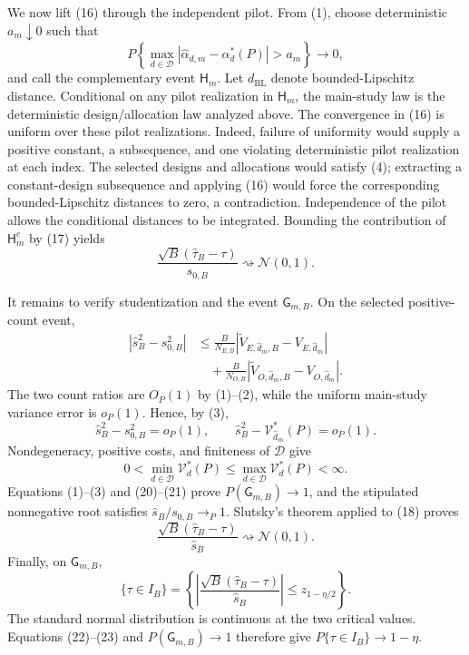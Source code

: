 We now lift (16) through the independent pilot.  From (1), choose deterministic \(a_m\downarrow0\) such that
\[
 P\left\{\max_{d\in\mathcal D}
 |\widehat\alpha_{d,m}-\alpha_d^*(P)|>a_m\right\}
 \longrightarrow0,                                         \tag{17}
\]
and call the complementary event \(\mathsf H_m\).  Let \(d_{\mathrm{BL}}\) denote bounded-Lipschitz distance.  Conditional on any pilot realization in \(\mathsf H_m\), the main-study law is the deterministic design/allocation law analyzed above.  The convergence in (16) is uniform over these pilot realizations.  Indeed, failure of uniformity would supply a positive constant, a subsequence, and one violating deterministic pilot realization at each index.  The selected designs and allocations would satisfy (4); extracting a constant-design subsequence and applying (16) would force the corresponding bounded-Lipschitz distances to zero, a contradiction.  Independence of the pilot allows the conditional distances to be integrated.  Bounding the contribution of \(\mathsf H_m^c\) by (17) yields
\[
 \frac{\sqrt B(\widehat\tau_B-\tau)}{s_{0,B}}
 \rightsquigarrow\mathcal N(0,1).                           \tag{18}
\]

It remains to verify studentization and the event \(\mathsf G_{m,B}\).  On the selected positive-count event,
\[
\begin{aligned}
 |\widehat s_B^2-s_{0,B}^2|
 &\le\frac{B}{N_{E,B}}
 |\widetilde V_{E,\widehat d_m,B}-V_{E,\widehat d_m}|\\
 &\quad+\frac{B}{N_{O,B}}
 |\widetilde V_{O,\widehat d_m,B}-V_{O,\widehat d_m}|.
\end{aligned}                                                \tag{19}
\]
The two count ratios are \(O_P(1)\) by (1)--(2), while the uniform main-study variance error is \(o_P(1)\).  Hence, by (3),
\[
 \widehat s_B^2-s_{0,B}^2=o_P(1),
 \qquad
 \widehat s_B^2-\mathcal V_{\widehat d_m}^*(P)=o_P(1).      \tag{20}
\]
Nondegeneracy, positive costs, and finiteness of \(\mathcal D\) give
\[
 0<\min_{d\in\mathcal D}\mathcal V_d^*(P)
 \le\max_{d\in\mathcal D}\mathcal V_d^*(P)<\infty.    \tag{21}
\]
Equations (1)--(3) and (20)--(21) prove
\(P(\mathsf G_{m,B})\to1\), and the stipulated nonnegative root satisfies \(\widehat s_B/s_{0,B}\to_P1\).  Slutsky's theorem applied to (18) proves
\[
 \frac{\sqrt B(\widehat\tau_B-\tau)}{\widehat s_B}
 \rightsquigarrow\mathcal N(0,1).                           \tag{22}
\]
Finally, on \(\mathsf G_{m,B}\),
\[
 \{\tau\in I_B\}
 =\left\{\left|
 \frac{\sqrt B(\widehat\tau_B-\tau)}{\widehat s_B}
 \right|\le z_{1-\eta/2}\right\}.                         \tag{23}
\]
The standard normal distribution is continuous at the two critical values.  Equations (22)--(23) and \(P(\mathsf G_{m,B})\to1\) therefore give \(P\{\tau\in I_B\}\to1-\eta\).